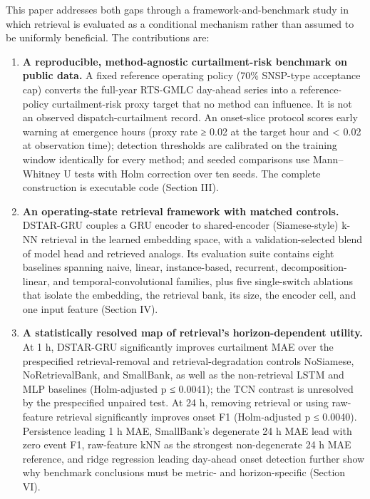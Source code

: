 \documentclass[
  10pt,
  a4paper,
]{article}
\providecommand{\tightlist}{%
  \setlength{\itemsep}{0pt}\setlength{\parskip}{0pt}}
\begin{document}
This paper addresses both gaps through a framework-and-benchmark study
in which retrieval is evaluated as a conditional mechanism rather than
assumed to be uniformly beneficial. The contributions are:

\begin{enumerate}
\def\labelenumi{\arabic{enumi}.}
\tightlist
\item
  \textbf{A reproducible, method-agnostic curtailment-risk benchmark on
  public data.} A fixed reference operating policy (70\% SNSP-type
  acceptance cap) converts the full-year RTS-GMLC day-ahead series into
  a reference-policy curtailment-risk proxy target that no method can
  influence. It is not an observed dispatch-curtailment record. An
  onset-slice protocol scores early warning at emergence hours (proxy
  rate ≥ 0.02 at the target hour and \textless{} 0.02 at observation
  time); detection thresholds are calibrated on the training window
  identically for every method; and seeded comparisons use Mann--Whitney
  U tests with Holm correction over ten seeds. The complete construction
  is executable code (Section III).
\item
  \textbf{An operating-state retrieval framework with matched controls.}
  DSTAR-GRU couples a GRU encoder to shared-encoder (Siamese-style) k-NN
  retrieval in the learned embedding space, with a validation-selected
  blend of model head and retrieved analogs. Its evaluation suite
  contains eight baselines spanning naive, linear, instance-based,
  recurrent, decomposition-linear, and temporal-convolutional families,
  plus five single-switch ablations that isolate the embedding, the
  retrieval bank, its size, the encoder cell, and one input feature
  (Section IV).
\item
  \textbf{A statistically resolved map of retrieval's horizon-dependent
  utility.} At 1 h, DSTAR-GRU significantly improves curtailment MAE
  over the prespecified retrieval-removal and retrieval-degradation
  controls NoSiamese, NoRetrievalBank, and SmallBank, as well as the
  non-retrieval LSTM and MLP baselines (Holm-adjusted p ≤ 0.0041); the
  TCN contrast is unresolved by the prespecified unpaired test. At 24 h,
  removing retrieval or using raw-feature retrieval significantly
  improves onset F1 (Holm-adjusted p ≤ 0.0040). Persistence leading 1 h
  MAE, SmallBank's degenerate 24 h MAE lead with zero event F1,
  raw-feature kNN as the strongest non-degenerate 24 h MAE reference,
  and ridge regression leading day-ahead onset detection further show
  why benchmark conclusions must be metric- and horizon-specific
  (Section VI).
\end{enumerate}
\end{document}
